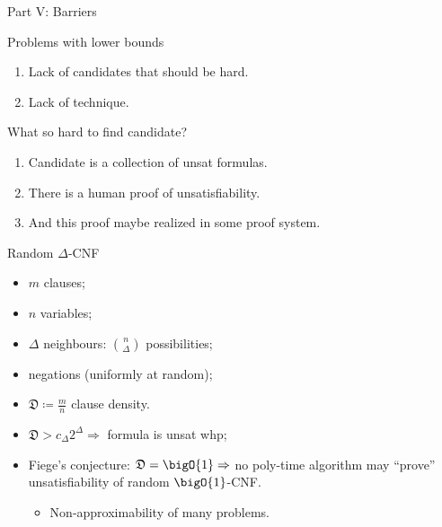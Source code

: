 \begin{frame}

    \begin{center}
        \Huge Part V: Barriers
    \end{center}
    
\end{frame}

\begin{frame}{Problems with lower bounds}

    \begin{enumerate}
        \item Lack of candidates that should be hard.
        \item Lack of technique.
    \end{enumerate}

    \pause
    What so hard to find candidate?
    \pause
    \begin{enumerate}
        \item Candidate is a collection of \alert{unsat} formulas.
        \item There is a human proof of unsatisfiability.
        \item And this proof maybe realized in some proof system.
    \end{enumerate}
\end{frame}

\begin{frame}{Random $\Delta$-CNF}

    \begin{minipage}{0.38\linewidth}
        \centering
        
    \end{minipage}
    \begin{minipage}{0.58\linewidth}
        \begin{itemize}
            \item $m$ clauses;
            \item $n$ variables;
            \item $\Delta$ neighbours: $\binom{n}{\Delta}$ possibilities;
            \item negations (uniformly at random);
            \item $\mathfrak{D} \coloneqq \frac{m}{n}$ clause density.
        \end{itemize}
    \end{minipage}

    \pause
    \begin{itemize}
        \item $\mathfrak{D} > c_{\Delta} 2^{\Delta} \Rightarrow$ formula is unsat whp;
            \pause
        \item Fiege's conjecture: $\mathfrak{D} = \bigO{1} \Rightarrow$ no poly-time algorithm may
            ``prove'' unsatisfiability of random $\bigO{1}$-CNF.
            \begin{itemize}
                \item Non-approximability of many problems.
            \end{itemize}
    \end{itemize}

\end{frame}

